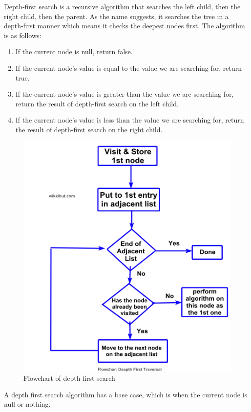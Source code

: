 \documentclass[12pt]{article}
\begin{document}
Depth-first search is a recursive algorithm that searches the left child, then the right child, then the parent.
As the name suggests, it searches the tree in a depth-first manner which means it checks the deepest nodes first.
The algorithm is as follows:
\begin{enumerate}
    \item If the current node is null, return false.
    \item If the current node's value is equal to the value we are searching for, return true.
    \item If the current node's value is greater than the value we are searching for, return the result of depth-first search on the left child.
    \item If the current node's value is less than the value we are searching for, return the result of depth-first search on the right child.
\end{enumerate}
\begin{figure}[h!]
    \centering
    \includegraphics[scale=.4]{images/flowchart.png}
    \caption{Flowchart of depth-first search}
\end{figure}
A depth first search algorithm has a base case, which is when the current node is null or nothing.
\end{document}
